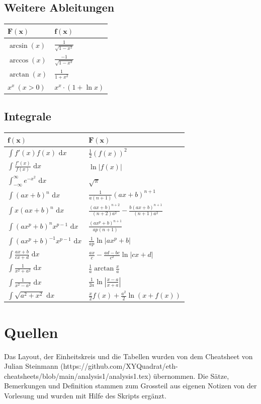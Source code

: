 \documentclass[a4paper,10pt]{article}
\def\dx{\text{ d}x}
\begin{document}
\subsection{Weitere Ableitungen}
\begin{center}
  \begin{tabularx}{\linewidth}{>{\centering\arraybackslash}X>{\centering\arraybackslash}X}
  \toprule
  $\mathbf{F(x)}$ & $\mathbf{f(x)}$ \\
  \midrule
  $\arcsin(x)$ & $\frac{1}{\sqrt{1 - x^2}}$ \\
  $\arccos(x)$ & $\frac{-1}{\sqrt{1 - x^2}}$ \\
  $\arctan(x)$ & $\frac{1}{1 + x^2}$ \\ 
  $x^x \ (x > 0)$ & $x^x \cdot (1 + \ln x)$ \\
  \bottomrule
  \end{tabularx}
\end{center}
\subsection{Integrale}
\begin{center}
 \begin{tabularx}{\linewidth}{>{\centering\arraybackslash}X>{\centering\arraybackslash}X}
  \toprule
  $\mathbf{f(x)}$ & $\mathbf{F(x)}$ \\
  \midrule
  $\int f'(x) f(x) \dx$ & $\frac{1}{2}(f(x))^2$ \\
  $\int \frac{f'(x)}{f(x)} \dx$ & $\ln|f(x)|$ \\
  $\int_{-\infty}^\infty e^{-x^2} \dx$ & $\sqrt{\pi}$ \\
  $\int (ax+b)^n \dx$ & $\frac{1}{a(n+1)}(ax+b)^{n+1}$ \\
  $\int x(ax+b)^n \dx$ & $\frac{(ax+b)^{n+2}}{(n+2)a^2} - \frac{b(ax+b)^{n+1}}{(n+1)a^2}$ \\
  $\int (ax^p+b)^n x^{p-1} \dx$ & $\frac{(ax^p+b)^{n+1}}{ap(n+1)}$ \\
  $\int (ax^p + b)^{-1} x^{p-1} \dx$ & $\frac{1}{ap} \ln |ax^p + b|$ \\
  $\int \frac{ax+b}{cx+d} \dx$ & $\frac{ax}{c} - \frac{ad-bc}{c^2} \ln |cx +d|$ \\
  $\int \frac{1}{x^2+a^2} \dx$ & $\frac{1}{a} \arctan \frac{x}{a}$ \\
  $\int \frac{1}{x^2 - a^2} \dx$ & $\frac{1}{2a} \ln\left| \frac{x-a}{x+a} \right|$ \\
  $\int \sqrt{a^2+x^2} \dx $ & $\frac{x}{2}f(x) + \frac{a^2}{2}\ln(x+f(x))$ \\
  \bottomrule
 \end{tabularx}
\end{center}
\section{Quellen}
Das Layout, der Einheitskreis und die Tabellen wurden von dem Cheatsheet von Julian Steinmann (https://github.com/XYQuadrat/eth-cheatsheets/blob/main/analysis1/analysis1.tex) übernommen. Die Sätze, Bemerkungen und Definition stammen zum Grossteil aus eigenen Notizen von der Vorlesung und wurden mit Hilfe des Skripts ergänzt.
\end{document}
